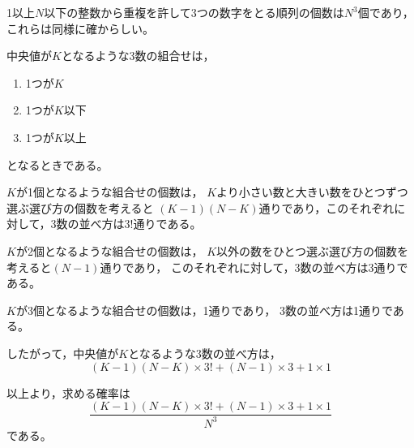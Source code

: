 \documentclass{article}
\begin{document}
1以上$N$以下の整数から重複を許して3つの数字をとる順列の個数は$N^3$個であり，
これらは同様に確からしい。

中央値が$K$となるような3数の組合せは，
\begin{enumerate}
    \renewcommand{\labelenumi}{\roman{enumi}).}
    \item 1つが$K$
    \item 1つが$K$以下
    \item 1つが$K$以上
\end{enumerate}
となるときである。

$K$が1個となるような組合せの個数は，
$K$より小さい数と大きい数をひとつずつ選ぶ選び方の個数を考えると
$(K - 1) (N - K)$通りであり，このそれぞれに対して，3数の並べ方は$3!$通りである。

$K$が2個となるような組合せの個数は，
$K$以外の数をひとつ選ぶ選び方の個数を考えると$(N - 1)$通りであり，
このそれぞれに対して，3数の並べ方は$3$通りである。

$K$が3個となるような組合せの個数は，1通りであり，
3数の並べ方は1通りである。

したがって，中央値が$K$となるような3数の並べ方は，
\begin{equation}
    (K - 1)(N - K) \times 3!
    + (N - 1) \times 3
    + 1 \times 1
\end{equation}

以上より，求める確率は
\begin{equation}
    \frac{
    (K - 1)(N - K) \times 3!
    + (N - 1) \times 3
    + 1 \times 1
    }{N^3}
\end{equation}
である。
\end{document}
